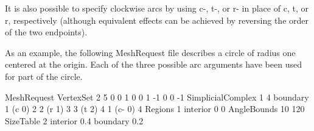 It is also possible to specify clockwise arcs by using {\sf c-}, {\sf
t-}, or {\sf r-} in place of {\sf c}, {\sf t}, or {\sf r},
respectively (although equivalent effects can be achieved by reversing
the order of the two endpoints).

As an example, the following MeshRequest file describes a circle of
radius one centered at the origin.  Each of the three possible arc
arguments have been used for part of the circle.

\begin{code}
MeshRequest
VertexSet 2 5
0 0
1 0
0 1
-1 0
0 -1
SimplicialComplex 1 4
boundary
1 (c 0) 2
2 (r 1) 3
3 (t 2) 4
1 (c- 0) 4
Regions 1
interior 0 0
AngleBounds 10 120
SizeTable 2
interior 0.4
boundary 0.2
\end{code}

